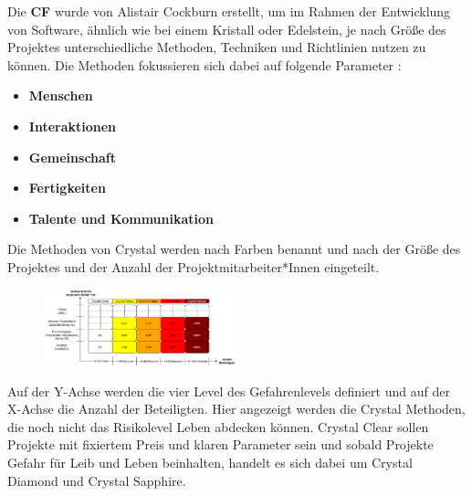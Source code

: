 Die \textbf{CF} wurde von Alistair Cockburn erstellt, um im Rahmen der Entwicklung von Software, ähnlich wie bei einem Kristall oder Edelstein, 
je nach Größe des Projektes unterschiedliche Methoden, Techniken und Richtlinien nutzen zu können. Die Methoden fokussieren sich dabei auf folgende Parameter \cite{Ibrahim2020-ip}:
\begin{itemize}
    \item \textbf{Menschen}
    \item \textbf{Interaktionen} 
    \item \textbf{Gemeinschaft}    
    \item \textbf{Fertigkeiten}
    \item \textbf{Talente und Kommunikation }
\end{itemize}
Die Methoden von Crystal werden nach Farben benannt und nach der Größe des Projektes und der Anzahl der Projektmitarbeiter*Innen eingeteilt.
\begin{figure}
    \centering
        \includegraphics[width=0.5\textwidth]{fig/CSD.png}
        \label{fig:title-image}
    \end{figure}
Auf der Y-Achse werden die vier Level des Gefahrenlevels definiert und auf der X-Achse die Anzahl der Beteiligten. Hier angezeigt werden die Crystal Methoden, die noch nicht das Risikolevel Leben abdecken können. 
Crystal Clear sollen Projekte mit fixiertem Preis und klaren Parameter sein und sobald Projekte Gefahr für Leib und Leben beinhalten, handelt es sich dabei um Crystal Diamond und Crystal Sapphire.\cite{cockburn2004,Ibrahim2020-ip}
\newline

